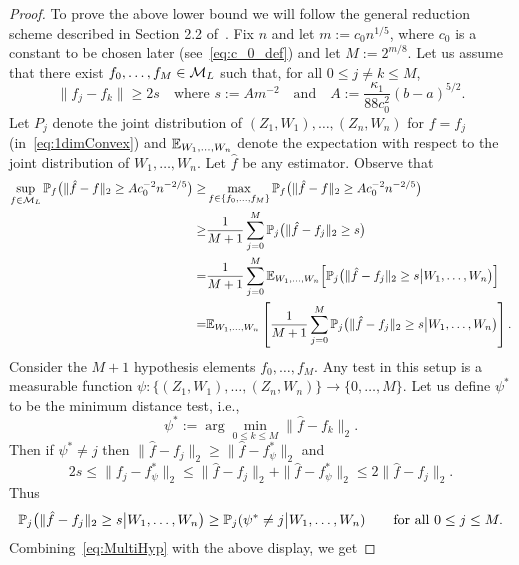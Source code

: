 \begin{proof}
To prove the above lower bound we will follow the general reduction scheme described in Section 2.2 of~\citet[Page 79]{MR2724359}. Fix $n$ and let $m := c_0 n^{1/5}$, where $c_0$ is a constant to be chosen later (see~\eqref{eq:c_0_def}) and let  $M := 2^{m/8}$. Let us assume that there exist $f_0, \ldots,f_M \in \mathcal{M}_L$ such that, for all $0\le j\ne k \le M$,
\begin{equation}\label{eq:prop-1&2f_j}
\|f_j -f_k\| \ge 2 s\quad\text{where }s :=A m^{-2}\quad\text{and}\quad A:= \frac{\kappa_1}{88 c_0^2}(b-a)^{5/2}.
 \end{equation}
Let  $P_j$ denote the  joint distribution of $(Z_1,W_1),\ldots, (Z_n,W_n)$ for $f= f_{j}$ (in~\eqref{eq:1dimConvex}) and $\mathbb{E}_{W_1, \ldots, W_n}$ denote the expectation with respect to the joint distribution of $W_1, \ldots, W_n$. Let $\hat f$ be any estimator. Observe that  \begin{align}
  \sup_{f \in \mathcal{M}_L} \mathbb{P}_f\big(\|\hat{f}-f\|_2 \ge A c_0^{-2} n^{-2/5}\big)
\ge&\max_{f \in \{f_{0}, \ldots, f_{M}\}} \mathbb{P}_f\big(\|\hat{f}-f\|_2 \ge A c_0^{-2} n^{-2/5}\big)\nonumber\\
\ge &\frac{1}{M+1}\sum_{j=0}^{M}\mathbb{P}_{j}\big(\|\hat{f}-f_j\|_2 \ge s\big)\label{eq:MultiHyp}\\
=& \frac{1}{M+1}\sum_{j=0}^{M}\mathbb{E}_{W_1, \ldots, W_n}\Big[\mathbb{P}_{j}\big(\|\hat{f}-f_j\|_2 \ge s\big\vert W_1, \ldots, W_n\big)\Big]\nonumber\\
=&  \mathbb{E}_{W_1, \ldots, W_n}\left[\frac{1}{M+1}\sum_{j=0}^{M}\mathbb{P}_{j}\big(\|\hat{f}-f_j\|_2 \ge s\big\vert W_1, \ldots, W_n\big)\right].\nonumber
\end{align}
Consider the $M+1$ hypothesis elements $f_0,\ldots, f_M$. Any test in this setup is a measurable function $\psi:\{(Z_1,W_1),\ldots, (Z_n,W_n)\} \to \{0,\ldots, M\}$.  {Let us define $\psi^* $ to be the minimum distance test, i.e., $$\psi^* := \arg \min_{0 \le k \le M} \|\hat f - f_k\|_2.$$ Then if $\psi^* \ne j$ then  $\|\hat{f}-f_j\|_2 \ge \|\hat{f}-f_\psi^*\|_2$ and \[
  2s \le \|f_j -f_\psi^*\|_2 \le \|\hat{f}-f_j\|_2 + \|\hat{f}-f_\psi^*\|_2 \le 2 \|\hat{f}-f_j\|_2.
\] Thus
\[\mathbb{P}_{j}\big(\|\hat{f}-f_j\|_2 \ge s\big\vert W_1, \ldots, W_n\big) \ge \mathbb{P}_j (\psi^* \ne j\big\vert W_1, \ldots, W_n) \qquad \text{for all } 0\le j \le M.\]}
Combining~\eqref{eq:MultiHyp} with the above display, we get

\end{proof}
